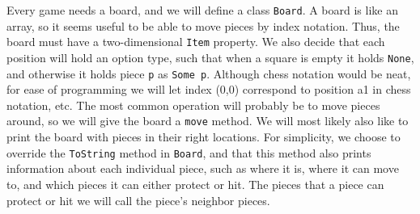 \documentclass[fsharpNotes.tex]{subfiles}
\begin{document}
%
Every game needs a board, and we will define a class \lstinline{Board}. A board is like an array, so it seems useful to be able to move pieces by index notation. Thus, the board must have a two-dimensional \lstinline{Item} property. We also decide that each position will hold an option type, such that when a square is empty it holds \lstinline{None}, and otherwise it holds piece \lstinline{p} as \lstinline{Some p}. Although chess notation would be neat, for ease of programming we will let index (0,0) correspond to position a1 in chess notation, etc. The most common operation will probably be to move pieces around, so we will give the board a \lstinline{move} method. We will most likely also like to print the board with pieces in their right locations. For simplicity, we choose to override the \lstinline{ToString} method in \lstinline{Board}, and that this method also prints information about each individual piece, such as where it is, where it can move to, and which pieces it can either protect or hit. The pieces that a piece can protect or hit we will call the piece's neighbor pieces.
\end{document}
